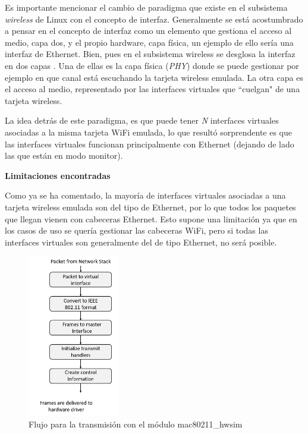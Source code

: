 Es importante mencionar el cambio de paradigma que existe en el subsistema \textit{wireless} de Linux con el concepto de interfaz. Generalmente se está acostumbrado a pensar en el concepto de interfaz como un elemento que gestiona el acceso al medio, capa dos, y el propio hardware, capa física, un ejemplo de ello sería una interfaz de Ethernet. Bien, pues en el subsistema wireless se desglosa la interfaz en dos capas \cite{8330098}. Una de ellas es la capa física (\textit{PHY}) donde se puede gestionar por ejemplo en que canal está escuchando la tarjeta wireless emulada. La otra capa es el acceso al medio, representado por las interfaces virtuales que ``cuelgan" de una tarjeta wireless.\\
\par
 La idea detrás de este paradigma, es que puede tener \textit{N} interfaces virtuales asociadas a la misma tarjeta WiFi emulada, lo que resultó sorprendente es que las interfaces virtuales funcionan principalmente con Ethernet (dejando de lado las que están en modo monitor).

\vspace{0.5cm}
\textbf{Limitaciones encontradas}\\
\par
\label{limitacionesEncontradas}

Como ya se ha comentado, la mayoría de interfaces virtuales asociadas a una tarjeta wireless emulada son del tipo de Ethernet, por lo que todos los paquetes que llegan vienen con cabeceras Ethernet. Esto supone una limitación ya que en los casos de uso se quería gestionar las cabeceras WiFi, pero si todas las interfaces virtuales son generalmente del de tipo Ethernet, no será posible.

\begin{figure}[ht]
    \centering
    \includegraphics[width=4cm]{archivos/img/dev/p4-wifi/analysis/linux_wireless_subsystem_tx.png}
    \caption{Flujo para la transmisión con el módulo mac80211\_hwsim \cite{5415877}}
    \label{fig:analysis_p4_wifi_7}
\end{figure}

